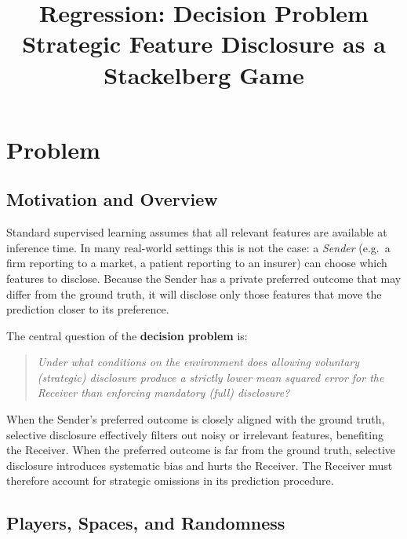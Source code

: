 \documentclass[11pt]{article}
\theoremstyle{definition}
\theoremstyle{remark}
\begin{document}
\title{\textbf{Regression: Decision Problem}\\[0.4em]
       \large Strategic Feature Disclosure as a Stackelberg Game}
\author{}
\date{}
\maketitle
\tableofcontents
\newpage

\section{Problem}

\subsection{Motivation and Overview}

Standard supervised learning assumes that all relevant features are available at inference time.
In many real-world settings this is not the case: a \emph{Sender} (e.g.\ a firm reporting to a
market, a patient reporting to an insurer) can choose which features to disclose.
Because the Sender has a private preferred outcome that may differ from the ground truth, it
will disclose only those features that move the prediction closer to its preference.

The central question of the \textbf{decision problem} is:
\begin{quote}
  \emph{Under what conditions on the environment does allowing voluntary (strategic)
  disclosure produce a strictly lower mean squared error for the Receiver than
  enforcing mandatory (full) disclosure?}
\end{quote}

When the Sender's preferred outcome is closely aligned with the ground truth, selective
disclosure effectively filters out noisy or irrelevant features, benefiting the Receiver.
When the preferred outcome is far from the ground truth, selective disclosure introduces
systematic bias and hurts the Receiver.
The Receiver must therefore account for strategic omissions in its prediction procedure.

\subsection{Players, Spaces, and Randomness}
\end{document}
